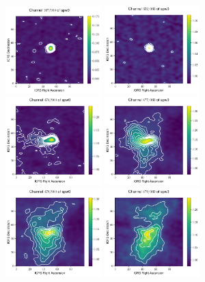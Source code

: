 \documentclass[10pt]{article}
\begin{document}
\begin{figure}
\includegraphics[width=0.33\textwidth]{spw0_167}
\includegraphics[width=0.33\textwidth]{spw0_332}
\includegraphics[width=0.33\textwidth]{spw0_474}
\includegraphics[width=0.33\textwidth]{spw0_477}
\includegraphics[width=0.33\textwidth]{spw0_478}
\includegraphics[width=0.33\textwidth]{spw0_479}

\end{figure}
\end{document}
